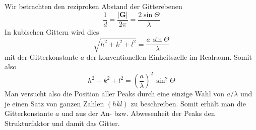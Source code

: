 Wir betrachten den reziproken Abstand der Gitterebenen
\begin{equation}
\frac{1}{d} = \frac{|\mathbf{G}|}{2 \pi} = \frac{2 \sin \Theta}{\lambda}
\end{equation}
In kubischen Gittern wird dies
\begin{equation}
 \sqrt{h^2 + k^2 + l^2} = \frac{a \, \sin \Theta}{\lambda}
\end{equation}
mit der Gitterkonstante $a$ der konventionellen Einheitszelle im Realraum. Somit also 
\begin{equation}
 h^2 + k^2 + l^2 = \left(\frac{a }{\lambda} \right)^2 \, \sin^2 \Theta
\end{equation}
Man versucht also die Position aller Peaks durch eine einzige Wahl von $a/\lambda$ und je einen Satz von ganzen Zahlen $(hkl)$ zu beschreiben. Somit erhält man die Gitterkonstante $a$ und aus der An- bzw. Abwesenheit der Peaks den Strukturfaktor und damit das Gitter.

 

\printbibliography[segment=\therefsegment,heading=subbibliography]

